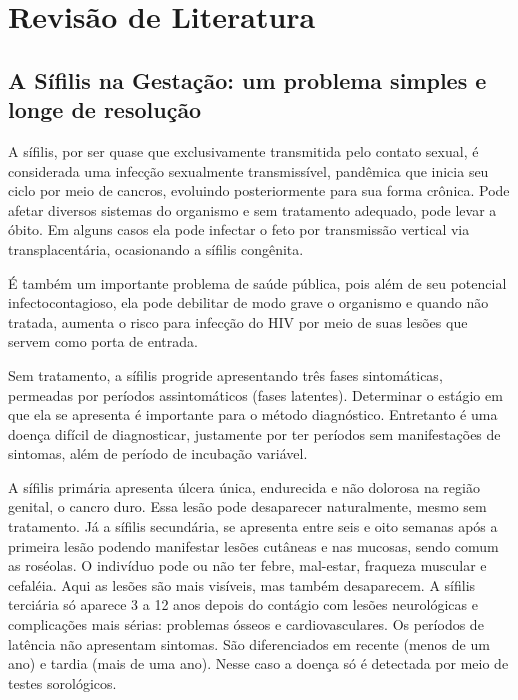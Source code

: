 \chapter{Revisão de Literatura}
\label{sec:revisao}

\section{A Sífilis na Gestação: um problema simples e longe de resolução}
A sífilis, por ser quase que exclusivamente transmitida pelo contato sexual, é considerada uma infecção sexualmente transmissível, pandêmica que inicia seu ciclo por meio de cancros, evoluindo posteriormente para sua forma crônica. Pode afetar diversos sistemas do organismo e sem tratamento adequado, pode levar a óbito. Em alguns casos ela pode infectar o feto por transmissão vertical via transplacentária, ocasionando a sífilis congênita. \cite{silva2015feelings}

É também um importante problema de saúde pública, pois além de seu potencial infectocontagioso, ela pode debilitar de modo grave o organismo e quando não tratada, aumenta o risco para infecção do HIV por meio de suas lesões que servem como porta de entrada. \cite{manual2016sifilis}

Sem tratamento, a sífilis progride apresentando três fases sintomáticas, permeadas por períodos assintomáticos (fases latentes). Determinar o estágio em que ela se apresenta é importante para o método diagnóstico. Entretanto é uma doença difícil de diagnosticar, justamente por ter períodos sem manifestações de sintomas, além de período de incubação variável. \cite{manual2016sifilis}

A sífilis primária apresenta úlcera única, endurecida e não dolorosa  na região genital, o cancro duro. Essa lesão pode desaparecer naturalmente, mesmo sem tratamento. Já a sífilis secundária, se apresenta entre seis e oito semanas após a primeira lesão podendo manifestar lesões cutâneas e nas mucosas, sendo comum as roséolas. O indivíduo pode ou não ter febre, mal-estar, fraqueza muscular e cefaléia. Aqui as lesões são mais visíveis, mas também desaparecem. A sífilis terciária só aparece 3 a 12 anos depois do contágio com lesões neurológicas e complicações mais sérias: problemas ósseos e cardiovasculares. Os períodos de latência não apresentam sintomas. São diferenciados em recente (menos de um ano) e tardia (mais de uma ano). Nesse caso a doença só é detectada por meio de testes sorológicos. \cite{manual2016sifilis}

